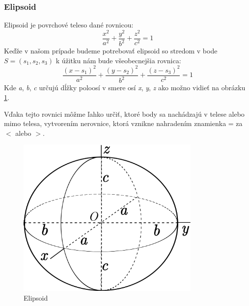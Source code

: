 	\subsubsection{Elipsoid}
	Elipsoid je povrchové teleso dané rovnicou:
	\begin{displaymath}
	\frac{x^2}{a^2} + \frac{y^2}{b^2}+ \frac{z^2}{c^2} = 1 
	\end{displaymath}
	Keďže v našom prípade budeme potrebovať elipsoid so stredom v bode \\ \begin{math}S = (s_1,s_2,s_3)\end{math}
	k úžitku nám bude všeobecnejšia rovnica:
	\begin{displaymath}
		\frac{(x - s_1)^2}{a^2} + \frac{(y - s_2)^2}{b^2}+ \frac{(z - s_3)^2}{c^2} = 1 
	\end{displaymath}
	Kde \textit{a}, \textit{b}, \textit{c} určujú dĺžky poloosí v smere osí \textit{x}, \textit{y}, \textit{z} ako možno vidieť na obrázku \ref{elipsoid}.
	
	Vďaka tejto rovnici môžme ľahko určiť, ktoré body sa nachádzajú v telese alebo mimo telesa, vytvorením nerovnice, ktorá vznikne nahradením znamienka = za \begin{math} < \end{math} alebo \begin{math} > \end{math}.

	\begin{figure}[ht!]
	\centering
	\includegraphics[width=90mm]{ellipsoid.png}
	\caption{Elipsoid}
	\label{elipsoid}
	\end{figure}
	
